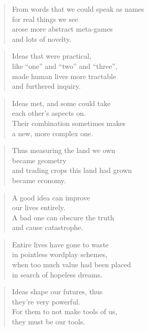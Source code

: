 \documentclass[10pt,a4paper]{article}
\begin{document}
\begin{multicols}{2}
\begin{verse}
From words that we could speak as names\\
for real things we see\\
arose more abstract meta-games\\
and lots of novelty.
\end{verse}

\begin{verse}
Ideas that were practical,\\
like “one” and “two” and “three”,\\
made human lives more tractable\\
and furthered inquiry.
\end{verse}

\begin{verse}
Ideas met, and some could take\\
each other’s aspects on.\\
Their combination sometimes makes\\
a new, more complex one.
\end{verse}

\begin{verse}
Thus measuring the land we own\\
became geometry\\
and trading crops this land had grown\\
became economy.
\end{verse}

\begin{verse}
A good idea can improve\\
our lives entirely.\\
A bad one can obscure the truth\\
and cause catastrophe.
\end{verse}

\begin{verse}
Entire lives have gone to waste\\
in pointless wordplay schemes,\\
when too much value had been placed\\
in search of hopeless dreams.
\end{verse}

\begin{verse}
Ideas shape our futures, thus\\
they’re very powerful.\\
For them to not make tools of us,\\
they must be our tools.
\end{verse}


\end{multicols}
\end{document}
